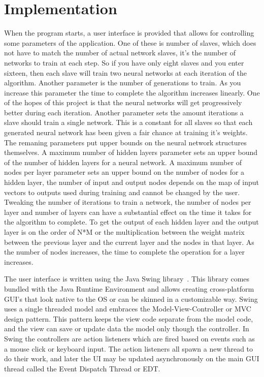\chapter[Implementation]{Implementation}
When the program starts, a user interface is provided that allows for controlling some parameters of the application. One of these is number of slaves, which does not have to match the number of actual network slaves, it's the number of networks to train at each step. So if you have only eight slaves and you enter sixteen, then each slave will train two neural networks at each iteration of the algorithm. Another parameter is the number of generations to train. As you increase this parameter the time to complete the algorithm increases linearly. One of the hopes of this project is that the neural networks will get progressively better during each iteration. Another parameter sets the amount iterations a slave should train a single network. This is a constant for all slaves so that each generated neural network has been given a fair chance at training it's weights. The remaning parameters put upper bounds on the neural network structures themselves. A maximum number of hidden layers parameter sets an upper bound of the number of hidden layers for a neural network. A maximum number of nodes per layer parameter sets an upper bound on the number of nodes for a hidden layer, the number of input and output nodes depends on the map of input vectors to outputs used during training and cannot be changed by the user. Tweaking the number of iterations to train a network, the number of nodes per layer and number of layers can have a substantial effect on the time it takes for the algorithm to complete. To get the output of each hidden layer and the output layer is on the order of N*M or the multiplication between the weight matrix between the previous layer and the current layer and the nodes in that layer. As the number of nodes increases, the time to complete the operation for a layer increases.

The user interface is written using the Java Swing library~\cite{swing}. This library comes bundled with the Java Runtime Environment and allows creating cross-platform GUI's that look native to the OS or can be skinned in a customizable way. Swing uses a single threaded model and embraces the Model-View-Controller or MVC design pattern. This pattern keeps the view code separate from the model code, and the view can save or update data the model only though the controller. In Swing the controllers are action listeners which are fired based on events such as a mouse click or keyboard input. The action listeners all spawn a new thread to do their work, and later the UI may be updated asynchronously on the main GUI thread called the Event Dispatch Thread or EDT.

